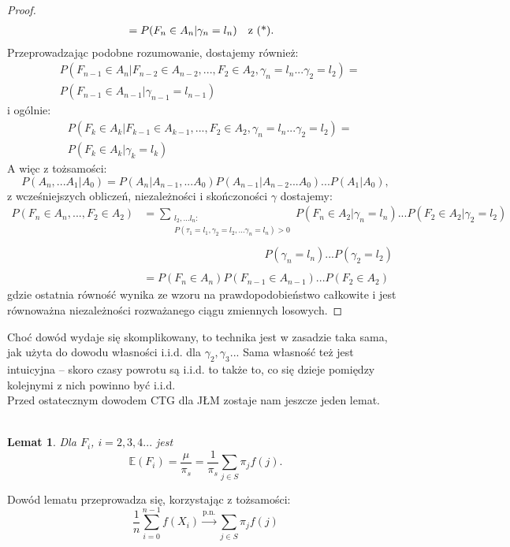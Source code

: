 \documentclass[a4paper]{article}
\theoremstyle{defn}
\theoremstyle{theorem}
\theoremstyle{lemma}
\newtheorem{lemma}[defn]{Lemat}
\theoremstyle{cor}
\theoremstyle{fact}
\begin{document}
\begin{proof}
\begin{align*}
    &= P(F_n \in A_n | \gamma_n = l_n) \text{\quad z (*).}
\end{align*}
Przeprowadzając podobne rozumowanie, dostajemy również:
\begin{align*}
&P(F_{n-1} \in A_n|F_{n-2} \in A_{n-2},  ..., F_2 \in A_2, \gamma_n = l_n ... \gamma_2 = l_2) =\\ & P(F_{n-1} \in A_{n-1} | \gamma_{n-1} = l_{n-1})
\end{align*}
i ogólnie:
\begin{align*}
&P(F_{k} \in A_k|F_{k-1} \in A_{k-1},  ..., F_2 \in A_2, \gamma_n = l_n ... \gamma_2 = l_2) =\\ & P(F_{k} \in A_{k} | \gamma_{k} = l_{k})
\end{align*}
A więc z tożsamości:
$$P(A_n, ... A_1|A_0) = P(A_n|A_{n-1}, ...A_0)P(A_{n-1}|A_{n-2}...A_0)...P(A_1|A_0),$$
z wcześniejszych obliczeń, niezależności i skończoności $\gamma$ dostajemy:
\begin{align*}
    P(F_n \in A_n, ..., F_2 \in A_2) &= \sum\limits_{\substack{l_2, ... l_n:\\P(\tau_1 = l_1, \gamma_2 = l_2, ... \gamma_n = l_n) > 0}} P(F_n \in A_2|\gamma_n = l_n) ... P(F_2 \in A_2|\gamma_2 = l_2)\\\\
    &\quad\quad\quad\quad\quad\quad\quad\quad\quad\quad\quad P(\gamma_n = l_n) ... P(\gamma_2 = l_2)\\\\
    &= P(F_n \in A_n)P(F_{n-1} \in A_{n-1}) ... P(F_2 \in A_2)
\end{align*}
gdzie ostatnia równość wynika ze wzoru na prawdopodobieństwo całkowite i jest równoważna niezależności rozważanego ciągu zmiennych losowych. 
\end{proof}
Choć dowód wydaje się skomplikowany, to technika jest w zasadzie taka sama, jak użyta do dowodu własności i.i.d. dla $\gamma_2, \gamma_3 ...$ Sama własność też jest intuicyjna – skoro czasy powrotu są i.i.d. to także to, co się dzieje pomiędzy kolejnymi z nich powinno być i.i.d.\\
Przed ostatecznym dowodem CTG dla JŁM zostaje nam jeszcze jeden lemat.\\
\\
\begin{lemma}\label{lemma2.6.4}
Dla $F_i$, $i=2,3,4...$ jest
$$\mathbb{E}(F_i) = \frac{\mu}{\pi_s} = \frac{1}{\pi_s}\sum\limits_{j \in S} \pi_j f(j).$$
\end{lemma}
Dowód lematu przeprowadza się, korzystając z tożsamości:
$$ \frac{1}{n} \sum\limits_{i=0}^{n-1} f(X_i) \overset{\text{p.n.}}{\to} \sum\limits_{j \in S} \pi_j f(j)$$
\end{document}
